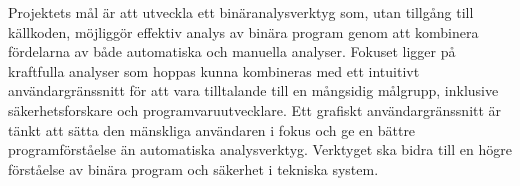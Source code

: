 Projektets mål är att utveckla ett binäranalysverktyg som, utan tillgång till
källkoden, möjliggör effektiv analys av binära program genom att kombinera
fördelarna av både automatiska och manuella analyser. Fokuset ligger på
kraftfulla analyser som hoppas kunna kombineras med ett intuitivt
användargränssnitt för att vara tilltalande till en mångsidig målgrupp,
inklusive säkerhetsforskare och programvaruutvecklare. Ett grafiskt
användargränssnitt är tänkt att sätta den mänskliga användaren i fokus och ge
en bättre programförståelse än automatiska analysverktyg. Verktyget ska bidra
till en högre förståelse av binära program och säkerhet i tekniska system.

